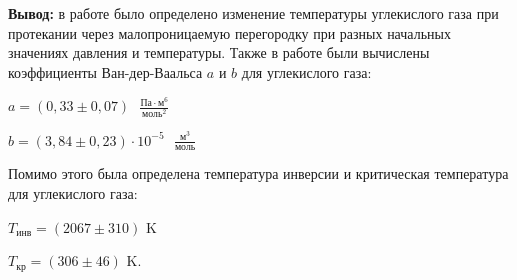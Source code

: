 \documentclass[a4paper, 12pt]{article}
\begin{document}
\textbf{Вывод:} в работе было определено изменение температуры углекислого газа при протекании через малопроницаемую перегородку при разных начальных значениях давления и температуры. Также в работе были вычислены коэффициенты Ван-дер-Ваальса $a$ и $b$ для углекислого газа:

\vspace{3mm}

$a = (0,33\pm 0,07)\text{ }\frac{\text{Па}\cdot \text{м}^6}{\text{моль}^2}$

\vspace{3mm}

$b = (3,84\pm 0,23)\cdot 10^{-5}\text{ }\frac{\text{м}^3}{\text{моль}}$

\vspace{3mm}

\noindent Помимо этого была определена температура инверсии и критическая температура для углекислого газа:

\vspace{3mm}

$T_{\text{инв}} = (2067\pm 310)$ K

\vspace{3mm}

$T_{\text{кр}} = (306\pm 46)$ K. 
\end{document}
